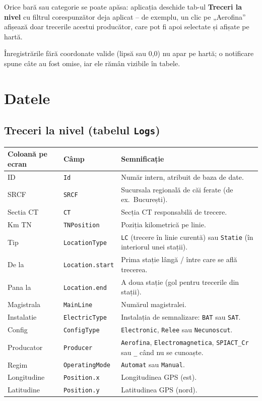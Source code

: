 \documentclass[11pt,a4paper]{article}
\newcommand{\code}[1]{\texttt{#1}}
\newcommand{\ui}[1]{\textsf{\textbf{#1}}}
\begin{document}
Orice bară sau categorie se poate apăsa: aplicația deschide tab-ul
\ui{Treceri la nivel} cu filtrul corespunzător deja aplicat -- de exemplu,
un clic pe „Aerofina” afișează doar trecerile acestui producător, care pot fi
apoi selectate și afișate pe hartă.

Înregistrările fără coordonate valide (lipsă sau 0,0) nu apar pe hartă; o
notificare spune câte au fost omise, iar ele rămân vizibile în tabele.

\section{Datele}
\label{sec:datamodel}

\subsection{Treceri la nivel (tabelul \code{Logs})}

\begin{longtable}{@{}p{2.3cm}p{3.1cm}p{9.0cm}@{}}
\toprule
\textbf{Coloană pe ecran} & \textbf{Câmp} & \textbf{Semnificație} \\
\midrule
\endhead
ID           & \code{Id}            & Număr intern, atribuit de baza de date. \\
SRCF         & \code{SRCF}          & Sucursala regională de căi ferate (de ex.\ București). \\
Sectia CT    & \code{CT}            & Secția CT responsabilă de trecere. \\
Km TN        & \code{TNPosition}    & Poziția kilometrică pe linie. \\
Tip          & \code{LocationType}  & \code{LC} (trecere în linie curentă) sau \code{Statie} (în interiorul unei stații). \\
De la        & \code{Location.start}& Prima stație lângă / între care se află trecerea. \\
Pana la      & \code{Location.end}  & A doua stație (gol pentru trecerile din stații). \\
Magistrala   & \code{MainLine}      & Numărul magistralei. \\
Instalatie   & \code{ElectricType}  & Instalația de semnalizare: \code{BAT} sau \code{SAT}. \\
Config       & \code{ConfigType}    & \code{Electronic}, \code{Relee} sau \code{Necunoscut}. \\
Producator   & \code{Producer}      & \code{Aerofina}, \code{Electromagnetica}, \code{SPIACT\_Cr} sau \code{\_} când nu se cunoaște. \\
Regim        & \code{OperatingMode} & \code{Automat} sau \code{Manual}. \\
Longitudine  & \code{Position.x}    & Longitudinea GPS (est). \\
Latitudine   & \code{Position.y}    & Latitudinea GPS (nord). \\
\bottomrule
\end{longtable}
\end{document}
